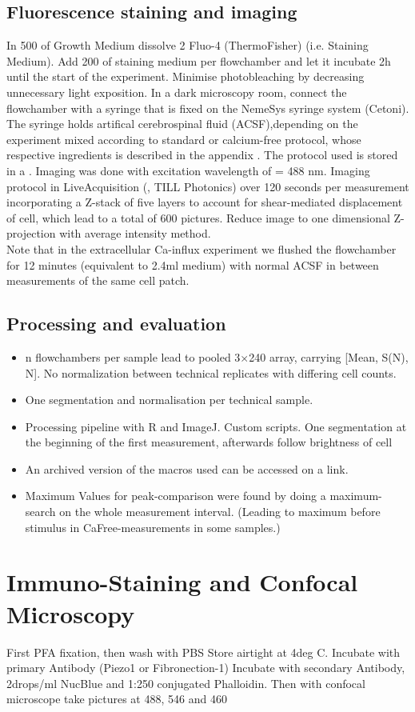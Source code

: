 \subsection{Fluorescence staining and imaging}
In 500\mul{} of Growth Medium dissolve 2\mul{} Fluo-4 (ThermoFisher) (i.e. Staining Medium). Add 200\mul{} of staining medium per flowchamber and let it incubate 2h until the start of the experiment. 
Minimise photobleaching by decreasing unnecessary light exposition. In a dark microscopy room, connect the flowchamber with a syringe that is fixed on the NemeSys syringe system (Cetoni). The syringe holds artifical cerebrospinal fluid (ACSF),depending on the experiment mixed according to standard or calcium-free protocol, whose respective ingredients is described in the appendix . The protocol used is stored in a \myworries{}. Imaging was done with excitation wavelength of \textlambda = 488 nm. Imaging protocol in LiveAcquisition (, TILL Photonics) over 120 seconds per measurement incorporating a Z-stack of five layers to account for shear-mediated displacement of cell, which lead to a total of 600 pictures. Reduce image to one dimensional Z-projection with average intensity method.  \\
Note that in the extracellular Ca-influx experiment we flushed the flowchamber for 12 minutes (equivalent to 2.4ml medium) with normal ACSF in between measurements of the same cell patch.


\subsection{Processing and evaluation}

\begin{itemize}
\item n flowchambers per sample lead to pooled 3$\times$240 array, carrying [Mean, S(N), N]. No normalization between technical replicates with differing cell counts. 
\item One segmentation and normalisation per technical sample.
\item Processing pipeline with R and ImageJ. Custom scripts. One segmentation at the beginning of the first measurement, afterwards follow brightness of cell
\item An archived version of the macros used can be accessed on a link.
\item Maximum Values for peak-comparison were found by doing a maximum-search on the whole measurement interval. (Leading to maximum before stimulus in CaFree-measurements in some samples.)
\end{itemize} 


\section{Immuno-Staining and Confocal Microscopy}
First PFA fixation, then wash with PBS
Store airtight at 4deg C.
Incubate with primary Antibody (Piezo1 or Fibronection-1)
Incubate with secondary Antibody, 2drops/ml NucBlue and 1:250 conjugated Phalloidin. 
Then with confocal microscope  take pictures at 488, 546 and 460



